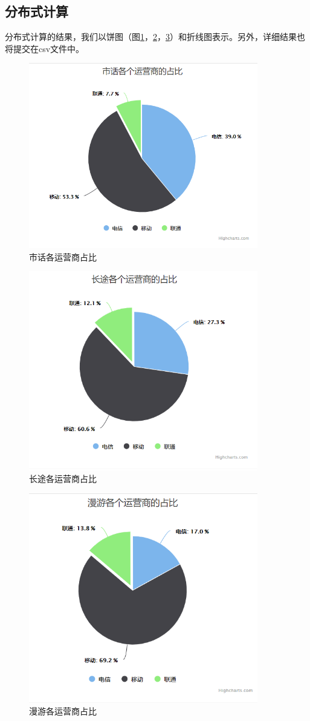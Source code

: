 \documentclass[12pt,a4paper]{article}
\begin{document}
\subsection{分布式计算}
分布式计算的结果，我们以饼图（图\ref{computing_result_1}，\ref{computing_result_2}，\ref{computing_result_3}）和折线图表示。另外，详细结果也将提交在csv文件中。
\begin{figure}[htb]
\centering
\includegraphics[width=10cm]{computing_result_1}
\caption{市话各运营商占比 \label{computing_result_1}}
\end{figure}
\begin{figure}[htb]
\centering
\includegraphics[width=10cm]{computing_result_2}
\caption{长途各运营商占比 \label{computing_result_2}}
\end{figure}
\begin{figure}[htb]
\centering
\includegraphics[width=10cm]{computing_result_3}
\caption{漫游各运营商占比 \label{computing_result_3}}
\end{figure}
\end{document}
